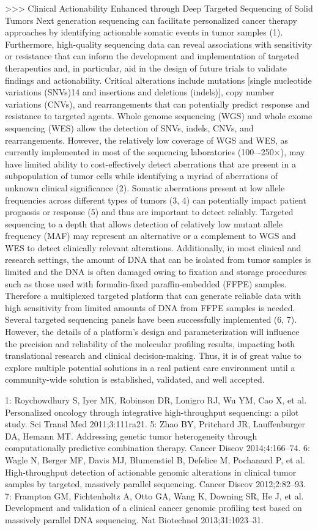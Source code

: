 >>> Clinical Actionability Enhanced through Deep Targeted Sequencing of Solid Tumors
Next generation sequencing can facilitate personalized cancer therapy approaches by identifying actionable somatic events in tumor samples (1). Furthermore, high-quality sequencing data can reveal associations with sensitivity or resistance that can inform the development and implementation of targeted therapeutics and, in particular, aid in the design of future trials to validate findings and actionability. Critical alterations include mutations [single nucleotide variations (SNVs)14 and insertions and deletions (indels)], copy number variations (CNVs), and rearrangements that can potentially predict response and resistance to targeted agents. Whole genome sequencing (WGS) and whole exome sequencing (WES) allow the detection of SNVs, indels, CNVs, and rearrangements. However, the relatively low coverage of WGS and WES, as currently implemented in most of the sequencing laboratories (100–-250×), may have limited ability to cost-effectively detect aberrations that are present in a subpopulation of tumor cells while identifying a myriad of aberrations of unknown clinical significance (2). Somatic aberrations present at low allele frequencies across different types of tumors (3, 4) can potentially impact patient prognosis or response (5) and thus are important to detect reliably. Targeted sequencing to a depth that allows detection of relatively low mutant allele frequency (MAF) may represent an alternative or a complement to WGS and WES to detect clinically relevant alterations. Additionally, in most clinical and research settings, the amount of DNA that can be isolated from tumor samples is limited and the DNA is often damaged owing to fixation and storage procedures such as those used with formalin-fixed paraffin-embedded (FFPE) samples. Therefore a multiplexed targeted platform that can generate reliable data with high sensitivity from limited amounts of DNA from FFPE samples is needed. Several targeted sequencing panels have been successfully implemented (6, 7). However, the details of a platform's design and parameterization will influence the precision and reliability of the molecular profiling results, impacting both translational research and clinical decision-making. Thus, it is of great value to explore multiple potential solutions in a real patient care environment until a community-wide solution is established, validated, and well accepted.

1: Roychowdhury S, Iyer MK, Robinson DR, Lonigro RJ, Wu YM, Cao X, et al. Personalized oncology through integrative high-throughput sequencing: a pilot study. Sci Transl Med 2011;3:111ra21.
5: Zhao BY, Pritchard JR, Lauffenburger DA, Hemann MT. Addressing genetic tumor heterogeneity through computationally predictive combination therapy. Cancer Discov 2014;4:166–74.
6: Wagle N, Berger MF, Davis MJ, Blumenstiel B, Defelice M, Pochanard P, et al. High-throughput detection of actionable genomic alterations in clinical tumor samples by targeted, massively parallel sequencing. Cancer Discov 2012;2:82–93.
7: Frampton GM, Fichtenholtz A, Otto GA, Wang K, Downing SR, He J, et al. Development and validation of a clinical cancer genomic profiling test based on massively parallel DNA sequencing. Nat Biotechnol 2013;31:1023–31.

